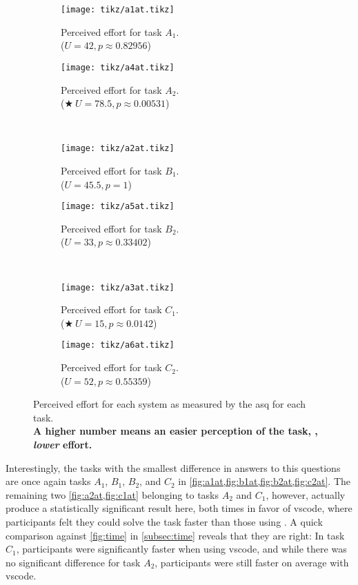 \documentclass[../thesis]{subfiles}
\begin{document}
\begin{figure}
	\begin{subfigure}[T]{0.5\textwidth}
		\caption{Perceived effort for task $A_1$.\\
			($U = 42, p \approx 0.82956$)
			\label{fig:a1at}}
		\texttt{[image: tikz/a1at.tikz]}
	\end{subfigure}\hfill
	\begin{subfigure}[T]{0.5\textwidth}
		\caption{Perceived effort for task $A_2$.\\
			($\bigstar\ U = 78.5, p \approx 0.00531$)\label{fig:a2at}}
		\texttt{[image: tikz/a4at.tikz]}
	\end{subfigure}\\
	\begin{subfigure}[T]{0.5\textwidth}
		\caption{Perceived effort for task $B_1$.\\
			($U = 45.5, p = 1$)\label{fig:b1at}}
		\texttt{[image: tikz/a2at.tikz]}
	\end{subfigure}\hfill
	\begin{subfigure}[T]{0.5\textwidth}
		\caption{Perceived effort for task $B_2$.\\
			($U = 33, p \approx 0.33402$)\label{fig:b2at}}
		\texttt{[image: tikz/a5at.tikz]}
	\end{subfigure}\\
	\begin{subfigure}[T]{0.5\textwidth}
		\caption{Perceived effort for task $C_1$.\\
			($\bigstar\ U = 15, p \approx 0.0142$)\label{fig:c1at}}
		\texttt{[image: tikz/a3at.tikz]}
	\end{subfigure}\hfill
	\begin{subfigure}[T]{0.5\textwidth}
		\caption{Perceived effort for task $C_2$.\\
			($U = 52, p \approx 0.55359$)\label{fig:c2at}}
		\texttt{[image: tikz/a6at.tikz]}
	\end{subfigure}
	\caption{Perceived effort for each system as measured by the \gls{asq} for each task.\\
		\textbf{A higher number means an easier perception of the task, \ie, \emph{lower} effort.}}\label{fig:asqt}
\end{figure}

Interestingly, the tasks with the smallest difference in answers to this questions are once again tasks $A_1$, $B_1$, $B_2$, and $C_2$ in \cref{fig:a1at,fig:b1at,fig:b2at,fig:c2at}.
The remaining two \cref{fig:a2at,fig:c1at} belonging to tasks $A_2$ and $C_1$, however, actually produce a statistically significant result here, both times in favor of \gls{vscode}, where participants felt they could solve the task faster than those using \SEE{}.
A quick comparison against \cref{fig:time} in \cref{subsec:time} reveals that they are right:
In task $C_1$, participants were significantly faster when using \gls{vscode}, and while there was no significant difference for task $A_2$, participants were still faster on average with \gls{vscode}.
\end{document}

